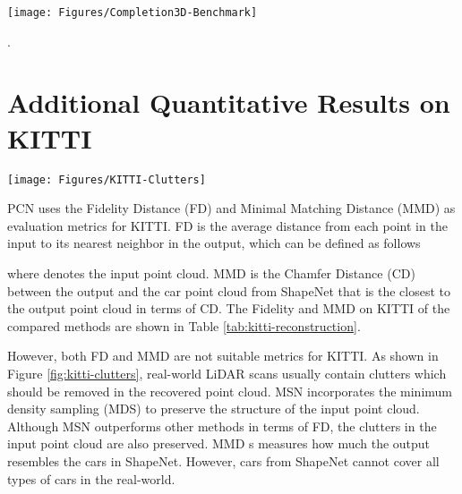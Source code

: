 \documentclass[runningheads]{llncs}
\begin{document}
\begin{figure*}[!t]
  \resizebox{\linewidth}{!} {
    \texttt{[image: Figures/Completion3D-Benchmark]}
  }
  \caption{The screenshot of the Completion3D benchmark results. Available online at \url{https://completion3d.stanford.edu/results}}.
  \label{fig:completion-3d-benchmark}
\end{figure*}

\section{Additional Quantitative Results on KITTI}
\label{sec:kitti-quantitative-results}

\begin{figure*}[!t]
  \resizebox{\linewidth}{!} {
    \texttt{[image: Figures/KITTI-Clutters]}
  }
  \caption{The clutters in the KITTI LiDAR Scan, as shown in the blue bounding box. Compared to MSN, GRNet recovers the complete point cloud while removing the clutters in the input point cloud.}
  \label{fig:kitti-clutters}
\end{figure*}

PCN \cite{DBLP:conf/ThreeDim/YuanKHMH18} uses the Fidelity Distance (FD) and Minimal Matching Distance (MMD) as evaluation metrics for KITTI.
FD is the average distance from each point in the input to its
nearest neighbor in the output, which can be defined as follows


where  denotes the input point cloud.
MMD is the Chamfer Distance (CD) between the output and the car point cloud from ShapeNet that is the closest to the output point cloud in terms of CD.
The Fidelity and MMD on KITTI of the compared methods are shown in Table \ref{tab:kitti-reconstruction}.

However, both FD and MMD are not suitable metrics for KITTI.
As shown in Figure \ref{fig:kitti-clutters}, real-world LiDAR scans usually contain clutters which should be removed in the recovered point cloud.
MSN \cite{DBLP:conf/aaai/LiuSYSH20} incorporates the minimum density sampling (MDS) to preserve the structure of the input point cloud.
Although MSN outperforms other methods in terms of FD, the clutters in the input point cloud are also preserved.
MMD s measures how much the output resembles the cars in ShapeNet.
However, cars from ShapeNet cannot cover all types of cars in the real-world.
\end{document}
